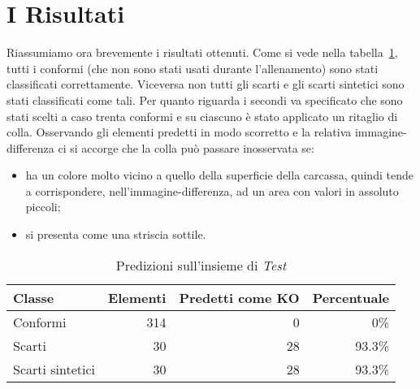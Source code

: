 \clearpage
\section{I Risultati}
Riassumiamo ora brevemente i risultati ottenuti.
Come si vede nella tabella~\ref{tab:test_predicions}, tutti i conformi (che non sono stati usati durante l'allenamento) sono stati classificati correttamente.
Viceversa non tutti gli scarti e gli scarti sintetici sono stati classificati come tali.
Per quanto riguarda i secondi va specificato che sono stati scelti a caso trenta conformi e su ciascuno è stato applicato un ritaglio di colla.
Osservando gli elementi predetti in modo scorretto e la relativa immagine-differenza ci si accorge che la colla può passare inosservata se:
\begin{itemize}
  \item ha un colore molto vicino a quello della superficie della carcassa, quindi tende a corrispondere, nell'immagine-differenza, ad un area con valori in assoluto piccoli;
  \item si presenta come una striscia sottile.
\end{itemize}

\begin{table}[ht]
  \centering
  \begin{tabular}{||l r r r||}
    \hline
    Classe           & Elementi & Predetti come KO & Percentuale \\ \hline \hline
    Conformi         & 314      & 0                & 0\%         \\ \hline
    Scarti           & 30       & 28               & 93.3\%      \\ \hline
    Scarti sintetici & 30       & 28               & 93.3\%      \\ \hline

  \end{tabular}
  \caption{Predizioni sull'insieme di \textit{Test}}
  \label{tab:test_predicions}
\end{table}

